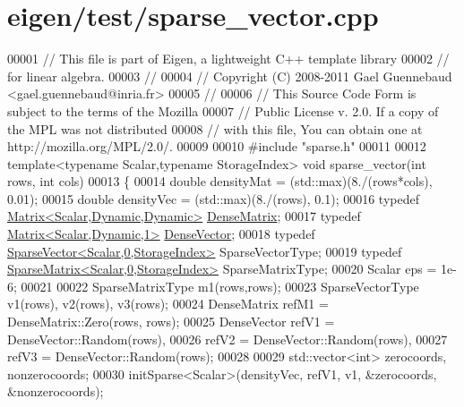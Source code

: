 \hypertarget{eigen_2test_2sparse__vector_8cpp_source}{}\section{eigen/test/sparse\+\_\+vector.cpp}
\label{eigen_2test_2sparse__vector_8cpp_source}

\begin{DoxyCode}
00001 \textcolor{comment}{// This file is part of Eigen, a lightweight C++ template library}
00002 \textcolor{comment}{// for linear algebra.}
00003 \textcolor{comment}{//}
00004 \textcolor{comment}{// Copyright (C) 2008-2011 Gael Guennebaud <gael.guennebaud@inria.fr>}
00005 \textcolor{comment}{//}
00006 \textcolor{comment}{// This Source Code Form is subject to the terms of the Mozilla}
00007 \textcolor{comment}{// Public License v. 2.0. If a copy of the MPL was not distributed}
00008 \textcolor{comment}{// with this file, You can obtain one at http://mozilla.org/MPL/2.0/.}
00009 
00010 \textcolor{preprocessor}{#include "sparse.h"}
00011 
00012 \textcolor{keyword}{template}<\textcolor{keyword}{typename} Scalar,\textcolor{keyword}{typename} StorageIndex> \textcolor{keywordtype}{void} sparse\_vector(\textcolor{keywordtype}{int} rows, \textcolor{keywordtype}{int} cols)
00013 \{
00014   \textcolor{keywordtype}{double} densityMat = (std::max)(8./(rows*cols), 0.01);
00015   \textcolor{keywordtype}{double} densityVec = (std::max)(8./(rows), 0.1);
00016   \textcolor{keyword}{typedef} \hyperlink{group___core___module}{Matrix<Scalar,Dynamic,Dynamic>} 
      \hyperlink{group___core___module}{DenseMatrix};
00017   \textcolor{keyword}{typedef} \hyperlink{group___core___module}{Matrix<Scalar,Dynamic,1>} \hyperlink{group___core___module}{DenseVector};
00018   \textcolor{keyword}{typedef} \hyperlink{group___sparse_core___module_class_eigen_1_1_sparse_vector}{SparseVector<Scalar,0,StorageIndex>} SparseVectorType;
00019   \textcolor{keyword}{typedef} \hyperlink{group___sparse_core___module_class_eigen_1_1_sparse_matrix}{SparseMatrix<Scalar,0,StorageIndex>} SparseMatrixType;
00020   Scalar eps = 1e-6;
00021 
00022   SparseMatrixType m1(rows,rows);
00023   SparseVectorType v1(rows), v2(rows), v3(rows);
00024   DenseMatrix refM1 = DenseMatrix::Zero(rows, rows);
00025   DenseVector refV1 = DenseVector::Random(rows),
00026               refV2 = DenseVector::Random(rows),
00027               refV3 = DenseVector::Random(rows);
00028 
00029   std::vector<int> zerocoords, nonzerocoords;
00030   initSparse<Scalar>(densityVec, refV1, v1, &zerocoords, &nonzerocoords);

\end{DoxyCode}
